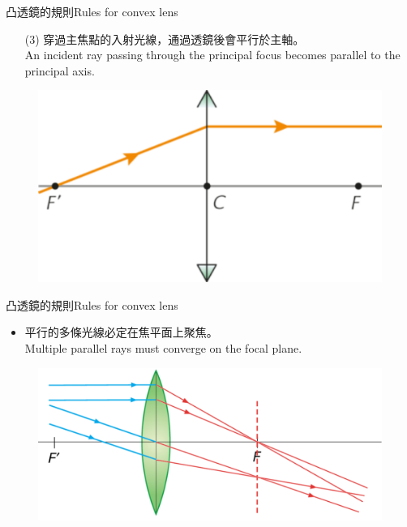 \documentclass[beamer=true]{standalone}
\begin{document}
\begin{frame}{凸透鏡的規則Rules for convex lens}
    \begin{itemize}
        \item [(3)] 穿過主焦點的入射光線，通過透鏡後會平行於主軸。\\An incident ray passing through the principal focus becomes parallel to the principal axis.
    \end{itemize}\bigskip

    \begin{figure}
        \centering
        \includegraphics[width=0.5\linewidth]{assets/di0923in93i2e.png}


    \end{figure}
\end{frame}

\begin{frame}{凸透鏡的規則Rules for convex lens}
    \begin{itemize}
        \item 平行的多條光線必定在焦平面上聚焦。\\Multiple parallel rays must converge on the focal plane.
    \end{itemize}
    \begin{figure}
        \centering
        \includegraphics[width=0.85\linewidth]{assets/d892u3nd98n32ge.png}


    \end{figure}
\end{frame}
\end{document}
